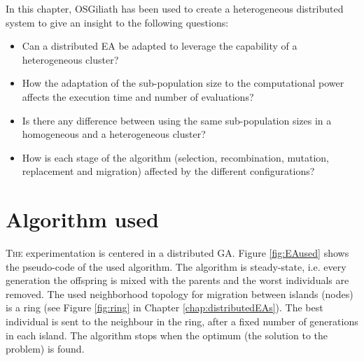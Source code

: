 In this chapter, OSGiliath has been used to create a heterogeneous distributed system to give an insight to the following questions:
\begin{itemize}
 \item Can a distributed EA be adapted to leverage the capability of a
   heterogeneous cluster?  %
 \item How the adaptation of the sub-population size to the
   computational power affects the execution time and number of
   evaluations?  %
 \item Is there any difference between using the same sub-population sizes in a homogeneous and a heterogeneous cluster?
 \item How is each stage of the algorithm (selection, recombination, mutation, replacement and migration) affected by the different
   configurations?  %
\end{itemize}

\section{Algorithm used}
\lettrine{T}{he} experimentation is centered in a distributed GA. Figure \ref{fig:EAused} shows the pseudo-code of the used algorithm. 
The algorithm is steady-state, i.e. every generation the offspring is
mixed with the parents and the worst individuals are removed. %
 The used neighborhood topology for migration between islands (nodes)
 is a ring (see Figure \ref{fig:ring} in Chapter
 \ref{chap:distributedEAs}). The best individual is sent to the
 neighbour in the ring, after a fixed number of generations in each
 island. The algorithm stops when the optimum (the solution to the
 problem) is found.   %

